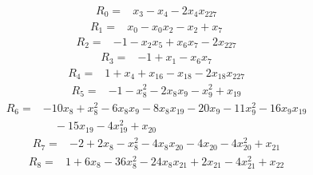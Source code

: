\begingroup\small
\begin{equation*}\begin{split}
R_{0}={}&x_{3} - x_{4} - 2x_{4} x_{227}
\end{split}\end{equation*}
\begin{equation*}\begin{split}
R_{1}={}&x_{0} - x_{0} x_{2} - x_{2} + x_{7}
\end{split}\end{equation*}
\begin{equation*}\begin{split}
R_{2}={}&-1 - x_{2} x_{5} + x_{6} x_{7} - 2x_{227}
\end{split}\end{equation*}
\begin{equation*}\begin{split}
R_{3}={}&-1 + x_{1} - x_{6} x_{7}
\end{split}\end{equation*}
\begin{equation*}\begin{split}
R_{4}={}&1 + x_{4} + x_{16} - x_{18} - 2x_{18} x_{227}
\end{split}\end{equation*}
\begin{equation*}\begin{split}
R_{5}={}&-1 - x_{8}^{2} - 2x_{8} x_{9} - x_{9}^{2} + x_{19}
\end{split}\end{equation*}
\begin{equation*}\begin{split}
R_{6}={}&-10x_{8} + x_{8}^{2} - 6x_{8} x_{9} - 8x_{8} x_{19} - 20x_{9} - 11x_{9}^{2} - 16x_{9} x_{19}\\
&\quad -15x_{19} - 4x_{19}^{2} + x_{20}
\end{split}\end{equation*}
\begin{equation*}\begin{split}
R_{7}={}&-2 + 2x_{8} - x_{8}^{2} - 4x_{8} x_{20} - 4x_{20} - 4x_{20}^{2} + x_{21}
\end{split}\end{equation*}
\begin{equation*}\begin{split}
R_{8}={}&1 + 6x_{8} - 36x_{8}^{2} - 24x_{8} x_{21} + 2x_{21} - 4x_{21}^{2} + x_{22}
\end{split}\end{equation*}
